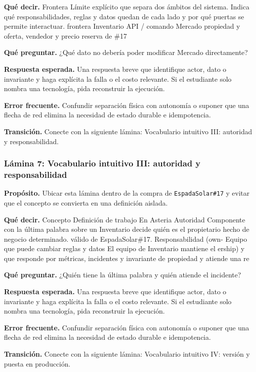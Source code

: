 \documentclass[variant=docente,cover=institutional,mode=screen]{ua-engineering-v6-article}
\begin{document}
\textbf{Qué decir.} Frontera Límite explícito que separa dos ámbitos del sistema. Indica qué responsabilidades, reglas y datos quedan de cada lado y por qué puertas se permite interactuar. frontera Inventario API / comando Mercado propiedad y oferta, vendedor y precio reserva de \#17

\textbf{Qué preguntar.} ¿Qué dato no debería poder modificar Mercado directamente?

\textbf{Respuesta esperada.} Una respuesta breve que identifique actor, dato o invariante y haga explícita la falla o el costo relevante. Si el estudiante solo nombra una tecnología, pida reconstruir la ejecución.

\textbf{Error frecuente.} Confundir separación física con autonomía o suponer que una flecha de red elimina la necesidad de estado durable e idempotencia.

\textbf{Transición.} Conecte con la siguiente lámina: Vocabulario intuitivo III: autoridad y responsabilidad.

\subsubsection*{Lámina 7: Vocabulario intuitivo III: autoridad y responsabilidad}
\textbf{Propósito.} Ubicar esta lámina dentro de la compra de \texttt{EspadaSolar\#17} y evitar que el concepto se convierta en una definición aislada.

\textbf{Qué decir.} Concepto Definición de trabajo En Asteria Autoridad Componente con la última palabra sobre un Inventario decide quién es el propietario hecho de negocio determinado. válido de EspadaSolar\#17. Responsabilidad (own- Equipo que puede cambiar reglas y datos El equipo de Inventario mantiene el ership) y que responde por métricas, incidentes y invariante de propiedad y atiende una re

\textbf{Qué preguntar.} ¿Quién tiene la última palabra y quién atiende el incidente?

\textbf{Respuesta esperada.} Una respuesta breve que identifique actor, dato o invariante y haga explícita la falla o el costo relevante. Si el estudiante solo nombra una tecnología, pida reconstruir la ejecución.

\textbf{Error frecuente.} Confundir separación física con autonomía o suponer que una flecha de red elimina la necesidad de estado durable e idempotencia.

\textbf{Transición.} Conecte con la siguiente lámina: Vocabulario intuitivo IV: versión y puesta en producción.
\end{document}
